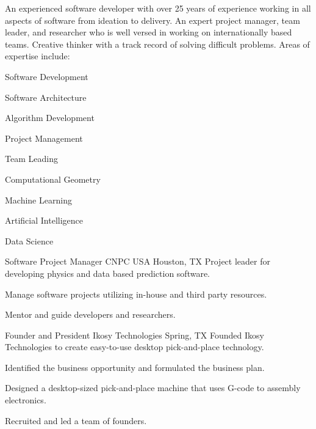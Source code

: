 \documentclass{leresume}
\begin{document}
	\thispagestyle{leempty}
	\makeresumeheaderC

	An experienced software developer with over 25 years of experience working in all aspects of software from ideation to delivery. An expert project manager, team leader, and researcher who is well versed in working on internationally based teams. Creative thinker with a track record of solving difficult problems. Areas of expertise include:
	\vspace{-6pt}
	\begin{multicols}{3}
		\begin{bulletedlist}
			
			\item Software Development
			\item Software Architecture
			\item Algorithm Development
			\item Project Management
			\item Team Leading
			\item Computational Geometry
			\item Machine Learning
			\item Artificial Intelligence
			\item Data Science
		\end{bulletedlist}
		\end{multicols}

	
		
            {Software Project Manager}
            {CNPC USA}
			{Houston, TX}
			Project leader for developing physics and data based prediction software.
		\begin{bulletedlist}
			
		\item
		
				Manage software projects utilizing in-house and third party resources.
			
		\item
		
				Mentor and guide developers and researchers.
			
		\end{bulletedlist}
	
            {Founder and President}
            {Ikosy Technologies}
			{Spring, TX}
			Founded Ikosy Technologies to create easy-to-use desktop pick-and-place technology.
		\begin{bulletedlist}
			
		\item
		
				Identified the business opportunity and formulated the business plan.
			
		\item
		
				Designed a desktop-sized pick-and-place machine that uses G-code to assembly electronics.
			
		\item
		
				Recruited and led a team of founders.
			
		\end{bulletedlist}
	
\end{document}
